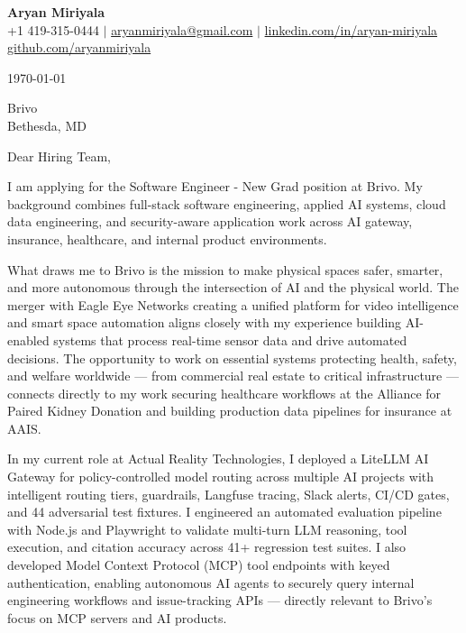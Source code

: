 \documentclass[letterpaper,11pt]{article}
\begin{document}
\begin{center}
  {\LARGE \textbf{Aryan Miriyala}}\\[2pt]
  \small
  +1 419-315-0444 $|$ \href{mailto:aryanmiriyala@gmail.com}{aryanmiriyala@gmail.com} $|$ \href{https://www.linkedin.com/in/aryan-miriyala-7788a21b6/}{linkedin.com/in/aryan-miriyala}\\
  \href{https://github.com/aryanmiriyala}{github.com/aryanmiriyala}
\end{center}\vspace{12pt}

\today

\vspace{12pt}

Brivo\\
Bethesda, MD

\vspace{12pt}

Dear Hiring Team,

\vspace{6pt}

I am applying for the Software Engineer - New Grad position at Brivo. My background combines full-stack software engineering, applied AI systems, cloud data engineering, and security-aware application work across AI gateway, insurance, healthcare, and internal product environments.

\vspace{6pt}

What draws me to Brivo is the mission to make physical spaces safer, smarter, and more autonomous through the intersection of AI and the physical world. The merger with Eagle Eye Networks creating a unified platform for video intelligence and smart space automation aligns closely with my experience building AI-enabled systems that process real-time sensor data and drive automated decisions. The opportunity to work on essential systems protecting health, safety, and welfare worldwide --- from commercial real estate to critical infrastructure --- connects directly to my work securing healthcare workflows at the Alliance for Paired Kidney Donation and building production data pipelines for insurance at AAIS.

\vspace{6pt}

In my current role at Actual Reality Technologies, I deployed a LiteLLM AI Gateway for policy-controlled model routing across multiple AI projects with intelligent routing tiers, guardrails, Langfuse tracing, Slack alerts, CI/CD gates, and 44 adversarial test fixtures. I engineered an automated evaluation pipeline with Node.js and Playwright to validate multi-turn LLM reasoning, tool execution, and citation accuracy across 41+ regression test suites. I also developed Model Context Protocol (MCP) tool endpoints with keyed authentication, enabling autonomous AI agents to securely query internal engineering workflows and issue-tracking APIs --- directly relevant to Brivo's focus on MCP servers and AI products.
\end{document}

